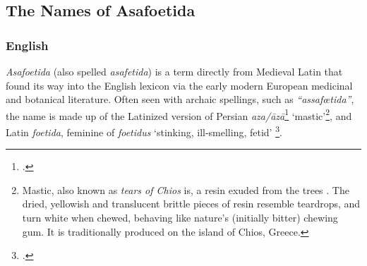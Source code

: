 \subsection{The Names of Asafoetida}

\subsubsection{English}



\textit{Asafoetida} (also spelled \textit{asafetida}) is a term directly from Medieval Latin that found its way into the English lexicon via the early modern European medicinal and botanical literature. Often seen with archaic spellings, such as \textit{``assafœtida''}, the name is made up of the Latinized version of Persian  \textit{aza/āzā}\footcite[][p. 42, \url{https://dsal.uchicago.edu/cgi-bin/app/steingass_query.py?page=42}]{steingass_comprehensive_1892} `mastic'\footnote{Mastic, also known as \textit{tears of Chios} is, a resin exuded from the trees . The dried, yellowish and translucent brittle pieces of resin resemble teardrops, and turn white when chewed, behaving like nature's (initially bitter) chewing gum. It is traditionally produced on the island of Chios, Greece.}, and Latin \textit{foetida}, feminine of \textit{foetidus} `stinking, ill-smelling, fetid' \footcite[asafoetida]{oed}. 

% 

